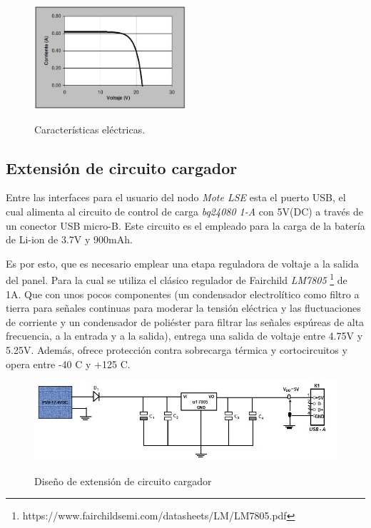 \begin{figure}[h!]
	\centering
    \includegraphics[width=0.5\textwidth]{./Figures/curva.JPG}
	\label{fig:curva}
	\caption{Características eléctricas.}
\end{figure}


\subsection{Extensión de circuito cargador}
\label{sec:extensión}
Entre las interfaces para el usuario del nodo \textit{Mote LSE} esta el puerto USB, el cual alimenta al circuito de control de carga \textit{bq24080 1-A} con 5V(DC) a través de un conector USB micro-B. Este circuito es el empleado para la carga de la batería de Li-ion de 3.7V y 900mAh.

Es por esto, que es necesario emplear una etapa reguladora de voltaje a la salida del panel. Para la cual se utiliza el clásico regulador de Fairchild \textit{LM7805} \footnote{https://www.fairchildsemi.com/datasheets/LM/LM7805.pdf} de 1A. Que con unos pocos componentes (un condensador electrolítico como filtro a tierra para señales continuas para moderar la tensión eléctrica y las fluctuaciones de corriente y un condensador de poliéster para filtrar las señales espúreas de alta frecuencia, a la entrada y a la salida), entrega una salida de voltaje entre 4.75V y 5.25V. Además, ofrece protección contra sobrecarga térmica y cortocircuitos y opera entre -40 \grados C y +125 \grados C.

\begin{figure}[h!]
	\centering
    \includegraphics[width=1\textwidth]{./Figures/circuito.jpg}
	\label{fig:circuito}
	\caption{Diseño de extensión de circuito cargador}
\end{figure}

